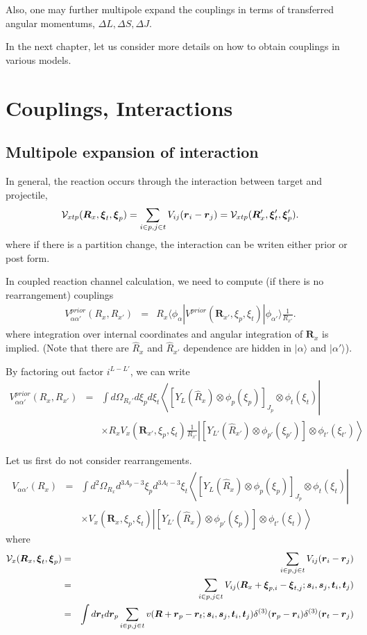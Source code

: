 \documentclass[11pt]{book}
\def\bm{\boldsymbol}
\def\vr{{\bm r}}
\def\vR{{\bm R}}
\def\la{\langle}
\def\ra{\rangle}
\newcommand{\bea}{\begin{eqnarray}}
\newcommand{\eea}{\end{eqnarray}}
\newcommand{\no}{\nonumber \\}
\begin{document}
Also, one may further multipole expand the couplings in terms of transferred angular momentums,
$\Delta L,\Delta S,\Delta J$. 

In the next chapter, let us consider more details on how to obtain couplings 
in various models.

\chapter{Couplings, Interactions}

\section{Multipole expansion of interaction}
In general, the reaction occurs through the interaction between target and projectile,
\bea 
{\cal V}_{xtp}({\bm R}_x,{\bm \xi}_t,{\bm \xi}_p)=\sum_{i\in p, j\in t} V_{ij}(\vr_i-\vr_j)
  ={\cal V}_{xtp}({\bm R}'_x,{\bm \xi}'_t,{\bm \xi}'_p).
\eea 
where if there is a partition change, the interaction can be 
writen either prior or post form. 

In coupled reaction channel calculation, we need to compute (if there is no rearrangement)
couplings 
\bea 
V^{prior}_{\alpha\alpha'}(R_x,R_{x'})&=& R_{x}
\la \phi_\alpha|V^{prior}({\bm R}_{x'},\xi_p,\xi_t)|\phi_{\alpha'}\ra\frac{1}{R_{x'}}. 
\eea 
where integration over internal coordinates and angular integration of ${\bm R}_x$
is implied. (Note that there are $\hat{R}_x$ and $\hat{R}_{x'}$ dependence are
hidden in $|\alpha\ra$ and $|\alpha'\ra$).  

By factoring out factor $i^{L-L'}$, we can write 
\bea 
V^{prior}_{\alpha\alpha'}(R_x,R_{x'})&=&
\int d\Omega_{R_x'} d\xi_p d\xi_t 
\left \la [Y_L(\hat{R}_x)\otimes \phi_p(\xi_p)]_{J_p}\otimes \phi_t(\xi_t)\right| 
 \no & & \times 
R_{x} V_x({\bm R}_{x'},\xi_p,\xi_t)\frac{1}{R_{x'}}\left| 
[Y_{L'}(\hat{R}_{x'})\otimes \phi_{p'}(\xi_{p'})]\otimes \phi_{t'}(\xi_{t'})\right\ra 
\eea 

Let us first do not consider rearrangements. 
\bea 
V_{\alpha\alpha'}(R_x)&=&
\int d^2\Omega_{R_x} d^{3A_p-3}\xi_p d^{3A_t-3}\xi_t 
\left \la [Y_L(\hat{R}_x)\otimes \phi_p(\xi_p)]_{J_p}\otimes \phi_t(\xi_t)\right| 
\no & & \times 
 V_x({\bm R}_{x},\xi_p,\xi_t)\left| 
[Y_{L'}(\hat{R}_{x})\otimes \phi_{p'}(\xi_{p})]\otimes \phi_{t'}(\xi_{t})\right\ra 
\eea 
where
\bea 
{\cal V}_{x}({\bm R}_x,{\bm \xi}_t,{\bm \xi}_p)
&=&\sum_{i\in p, j\in t} V_{ij}(\vr_i-\vr_j) \no 
&=&\sum_{i\in p, j\in t} V_{ij}(\vR_x+{\bm \xi}_{p,i}-{\bm\xi}_{t,j};{\bm s}_i,{\bm s}_j,{\bm t}_i,{\bm t}_j) \no 
&=&\int d{\bm r}_t d{\bm r}_p   
\sum_{i\in p, j\in t} v({\bm R}+\vr_p-\vr_t;{\bm s}_i,{\bm s}_j,{\bm t}_i,{\bm t}_j) 
    \delta^{(3)}(\vr_p-\vr_i)\delta^{(3)}(\vr_t-\vr_j) 
\eea 
\end{document}

